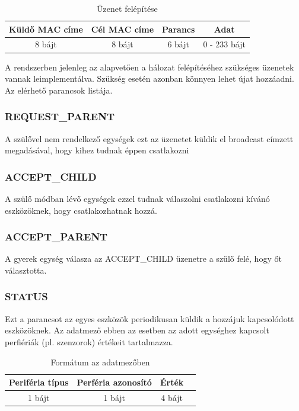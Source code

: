 \begin{table}[ht]
	\footnotesize
	\centering
	\begin{tabular}{ | c | c | c | c |}
		\toprule
		Küldő MAC címe & Cél MAC címe & Parancs & Adat \\
		\midrule
        8 bájt & 8 bájt & 6 bájt & 0 - 233 bájt \\
	\end{tabular}
	\caption{Üzenet felépítése}
	\label{tab:TabularExample}
\end{table}

A rendszerben jelenleg az alapvetően a hálozat felépítéséhez szükséges üzenetek vannak leimplementálva. Szükség esetén azonban könnyen lehet újat hozzáadni. Az elérhető parancsok listája.

\subsubsection{REQUEST\_PARENT}
A szülővel nem rendelkező egységek ezt az üzenetet küldik el broadcast címzett megadásával, hogy kihez tudnak éppen csatlakozni
\subsubsection{ACCEPT\_CHILD}
A szülő módban lévő egységek ezzel tudnak válaszolni csatlakozni kívánó eszközöknek, hogy csatlakozhatnak hozzá.
\subsubsection{ACCEPT\_PARENT}
A gyerek egység válasza az ACCEPT\_CHILD üzenetre a szülő felé, hogy őt választotta.
\subsubsection{STATUS}
Ezt a parancsot az egyes eszközök periodikusan küldik a hozzájuk kapcsolódott eszközöknek. Az adatmező ebben az esetben az adott egységhez kapcsolt perfiériák (pl. szenzorok) értékeit tartalmazza. 

\begin{table}[ht]
	\footnotesize
	\centering
	\begin{tabular}{ | c | c | c | c |}
		\toprule
		Periféria típus & Perféria azonosító & Érték \\
		\midrule
        1 bájt & 1 bájt & 4 bájt \\
	\end{tabular}
	\caption{Formátum az adatmezőben}
	\label{tab:network_data_format}
\end{table}

